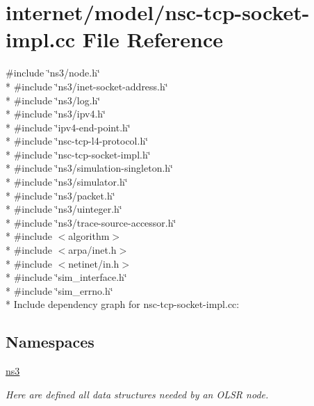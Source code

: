 \hypertarget{nsc-tcp-socket-impl_8cc}{}\section{internet/model/nsc-\/tcp-\/socket-\/impl.cc File Reference}
\label{nsc-tcp-socket-impl_8cc}
{\ttfamily \#include \char`\"{}ns3/node.\+h\char`\"{}}\\*
{\ttfamily \#include \char`\"{}ns3/inet-\/socket-\/address.\+h\char`\"{}}\\*
{\ttfamily \#include \char`\"{}ns3/log.\+h\char`\"{}}\\*
{\ttfamily \#include \char`\"{}ns3/ipv4.\+h\char`\"{}}\\*
{\ttfamily \#include \char`\"{}ipv4-\/end-\/point.\+h\char`\"{}}\\*
{\ttfamily \#include \char`\"{}nsc-\/tcp-\/l4-\/protocol.\+h\char`\"{}}\\*
{\ttfamily \#include \char`\"{}nsc-\/tcp-\/socket-\/impl.\+h\char`\"{}}\\*
{\ttfamily \#include \char`\"{}ns3/simulation-\/singleton.\+h\char`\"{}}\\*
{\ttfamily \#include \char`\"{}ns3/simulator.\+h\char`\"{}}\\*
{\ttfamily \#include \char`\"{}ns3/packet.\+h\char`\"{}}\\*
{\ttfamily \#include \char`\"{}ns3/uinteger.\+h\char`\"{}}\\*
{\ttfamily \#include \char`\"{}ns3/trace-\/source-\/accessor.\+h\char`\"{}}\\*
{\ttfamily \#include $<$algorithm$>$}\\*
{\ttfamily \#include $<$arpa/inet.\+h$>$}\\*
{\ttfamily \#include $<$netinet/in.\+h$>$}\\*
{\ttfamily \#include \char`\"{}sim\+\_\+interface.\+h\char`\"{}}\\*
{\ttfamily \#include \char`\"{}sim\+\_\+errno.\+h\char`\"{}}\\*
Include dependency graph for nsc-\/tcp-\/socket-\/impl.cc\+:
\subsection*{Namespaces}
\begin{DoxyCompactItemize}
\item 
 \hyperlink{namespacens3}{ns3}
\begin{DoxyCompactList}\small\item\em Here are defined all data structures needed by an O\+L\+SR node. \end{DoxyCompactList}\end{DoxyCompactItemize}
